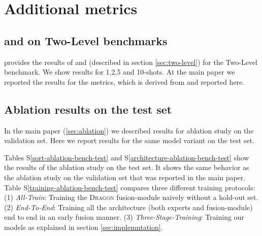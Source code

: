 \documentclass[10pt,twocolumn,letterpaper]{article}
\newcommand{\DRAGON}{\textsc{Dragon}}
\begin{document}
\section{Additional metrics}




\subsection{ and  on Two-Level benchmarks}
\label{appendix:ms-fs-two-level}
 provides the results of  and  (described in section \ref{sec:two-level}) for the Two-Level benchmark. We show results for 1,2,5 and 10-shots.
At the main paper we reported the results for the  metrics, which is derived from  and  reported here.



\subsection{Ablation results on the test set}
\label{appendix:ablation-test-set}



In the main paper (\ref{sec:ablation}) we described results for ablation study on the validation set. Here we report results for the same model variant on the test set. 

Tables S\ref{sort-ablation-bench-test} and S\ref{architecture-ablation-bench-test} show the results of the ablation study on the test set. It shows the same behavior as the ablation study on the validation set that was reported in the main paper.
Table S\ref{training-ablation-bench-test} compares three different training protocols: (1) \textit{All-Train}: Training the \DRAGON{} fusion-module naively without a hold-out set. 
(2) \textit{End-To-End}: Training all the architecture  (both experts and fusion-module) end to end in an early fusion manner. 
(3) \textit{Three-Stage-Training}: Training our models as explained in section \ref{sec:implemntation}.




\clearpage
\end{document}
